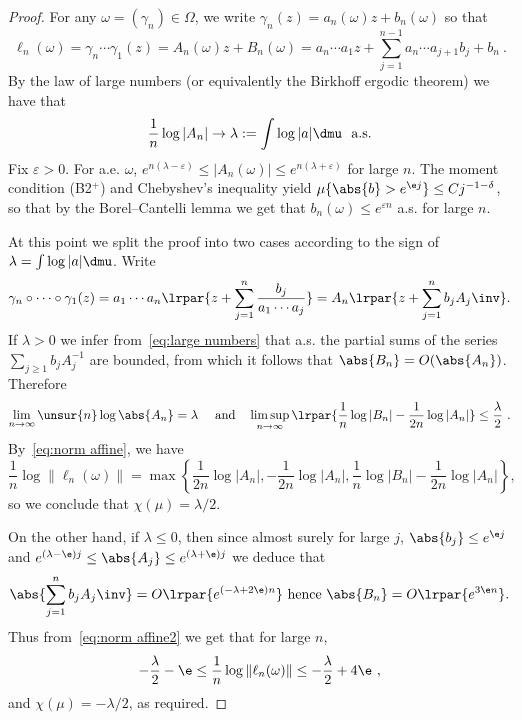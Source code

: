 \begin{proof}
For any $\omega = (\gamma_n) \in \Omega$, we write $\gamma_n(z) = a_n(\omega) z+b_n(\omega)$ so that
\[
\ell_n(\omega) = \gamma_n \cdots \gamma_1 (z) = A_n(\omega) z + B_n(\omega) = a_n\cdots a_1 z + \sum_{j=1}^{n-1} a_n\cdots a_{j+1} b_j + b_n
~.
\]
By the law of large numbers (or equivalently the Birkhoff ergodic theorem) we have that
\begin{equation}\label{eq:large numbers}
\frac1n \log| A_n| \to \lambda :=
\int \log |a| \dmu~\text{ a.s.}
\end{equation}
Fix $\varepsilon >0$. For a.e. $\omega$, $ e^{n(\lambda - \varepsilon)} \le |A_n(\omega) |\le e^{n(\lambda + \varepsilon)}$ for large $n$. The moment condition (B2${}^+$) and Chebyshev's inequality yield $\mu \{ \abs{b}> e^{\e j} \} \le C j^{-1-\delta}$, so that by the Borel--Cantelli lemma we get that $b_n(\omega) \le e^{\varepsilon n}$ a.s. for large $n$.

At this point we split the proof into two cases according to the sign of $\lambda= \int \log |a| \dmu$.
Write
\[
\gamma_n\circ \cdots \circ \gamma_1 (z) = a_1\cdots a_n \lrpar{z+ \sum_{j=1}^{n} \frac{b_j}{a_1\cdots a_j}}
= A_n\lrpar{z+ \sum_{j=1}^n b_jA_j\inv}.
\]
If $\lambda>0$ we infer from~\eqref{eq:large numbers} that
a.s. the partial sums of the series $\sum_{j\geq 1} b_j A_j^{-1}$ are bounded, from which it follows that $\abs{B_n} = O(\abs{A_n})$. Therefore
\[
\lim_{n\to \infty} \unsur{n} \log \abs{A_n} = \lambda \quad\text{ and}\quad \limsup_{n\to\infty}
\lrpar{\frac1{n} \log |B_n| - \frac1{2n} \log |A_n| }\leq \frac{\lambda}{2}~.
\]
By~\eqref{eq:norm affine}, we have
\begin{equation}\label{eq:norm affine2}
\frac1n \log \| \ell_n(\omega)\| = \max \left\{ \frac1{2n} \log |A_n|, - \frac1{2n} \log |A_n|, \frac1{n} \log |B_n| - \frac1{2n} \log |A_n|\right\},
\end{equation}
so we conclude that $\chi(\mu) = {\lambda}/{2}$.

On the other hand, if $\lambda\leq 0$, then since almost surely for large $j$, $\abs{b_j}\leq e^{\e j}$ and $e^{(\lambda-\e) j}\leq \abs{A_j}\leq e^{(\lambda+\e) j}$ we deduce that
\[
\abs{ \sum_{j=1}^n b_jA_j\inv} = O \lrpar{e^{(-\lambda +2\e)n}} \text{ hence } \abs{B_n} = O\lrpar{ e^{3\e n}}.
\]
Thus from~\eqref{eq:norm affine2} we get that for large $n$,
\[
-\frac{\lambda}{2} -\e \leq \frac1n \log \| \ell_n(\omega)\| \leq -\frac{\lambda}{2} + 4\e~,
\]
and
$\chi(\mu) = - {\lambda}/{2}$, as required.
\end{proof}

